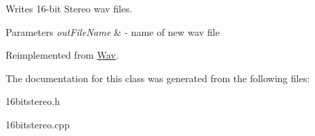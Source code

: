 Writes 16-\/bit Stereo wav files.


\begin{DoxyParams}{Parameters}
{\em out\+File\+Name} & -\/ name of new wav file \\
\hline
\end{DoxyParams}


Reimplemented from \hyperlink{classWav_a7bae34f37288c53cb113e76045f78098}{Wav}.



The documentation for this class was generated from the following files\+:\begin{DoxyCompactItemize}
\item 
16bitstereo.\+h\item 
16bitstereo.\+cpp\end{DoxyCompactItemize}
